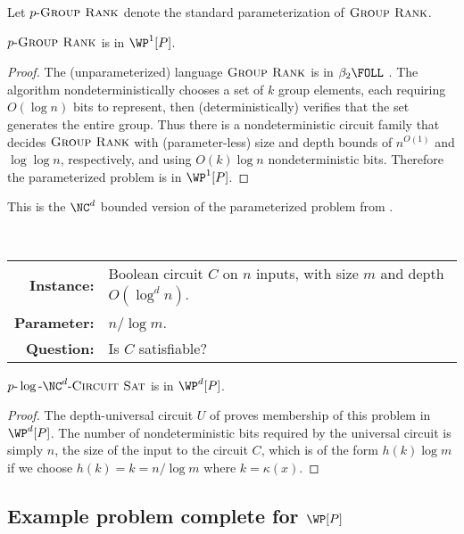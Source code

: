 \documentclass{article}
\newcommand{\dash}{\textnormal{-}}
\newcommand{\pncsat}{p\dash\log\dash\NC^d\dash\textsc{Circuit Sat}}
\newcommand{\pgrouprank}{p\dash\textsc{Group Rank}}
\begin{document}
Let $\pgrouprank$ denote the standard parameterization of $\textsc{Group Rank}$.

\begin{theorem}
  $\pgrouprank$ is in $\WP^1[P]$.
\end{theorem}
\begin{proof}
  The (unparameterized) language $\textsc{Group Rank}$ is in $\beta_2 \FOLL$ \autocite[Theorem~4.2]{grouprank}.
  The algorithm nondeterministically chooses a set of $k$ group elements, each requiring $O(\log n)$ bits to represent, then (deterministically) verifies that the set generates the entire group.
  Thus there is a nondeterministic circuit family that decides $\textsc{Group Rank}$ with (parameter-less) size and depth bounds of $n^{O(1)}$ and $\log \log n$, respectively, and using $O(k) \log n$ nondeterministic bits.
  Therefore the parameterized problem is in $\WP^1[P]$.
\end{proof}

This is the $\NC^d$ bounded version of the parameterized problem from \autocite[Lemma~3.26]{fg06}.

\begin{definition}[$\pncsat$]
  \mbox{} \\
  \begin{tabular}{r p{9.2cm}}
    \textbf{Instance:} & Boolean circuit $C$ on $n$ inputs, with size $m$ and depth $O(\log^d n)$. \\
    \textbf{Parameter:} & $n / \log m$. \\
    \textbf{Question:} & Is $C$ satisfiable?
  \end{tabular}
\end{definition}

\begin{lemma}\label{lem:pncsat}
  $\pncsat$ is in $\WP^d[P]$.
\end{lemma}
\begin{proof}
  The depth-universal circuit $U$ of \autocite{ch85} proves membership of this problem in $\WP^d[P]$.
  The number of nondeterministic bits required by the universal circuit is simply $n$, the size of the input to the circuit $C$, which is of the form $h(k) \log m$ if we choose $h(k) = k = n / \log m$ where $k = \kappa(x)$.
\end{proof}

\subsection{Example problem complete for \texorpdfstring{$\WP[P]$}{WP[P]}}
\end{document}
